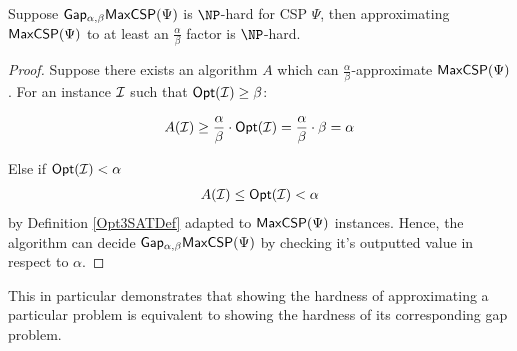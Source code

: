 \begin{theorem} \label{GapCSPtoAlgHard}
Suppose $\mathsf{Gap_{\alpha,\beta}}\mathsf{MaxCSP}(\Psi)$ is $\NP$-hard for CSP $\Psi$, then approximating $\mathsf{MaxCSP}(\Psi)$ to at least an $\frac{\alpha}{\beta}$ factor is $\NP$-hard.
\end{theorem}
%
\begin{proof}
Suppose there exists an algorithm $A$ which can $\frac{\alpha}{\beta}$-approximate $\mathsf{MaxCSP}(\Psi)$. For an instance $\mathcal{I}$ such that $\mathsf{Opt}(\mathcal{I}) \geq \beta$:

\begin{gather*}
A(\mathcal{I}) \geq  \frac{\alpha}{\beta} \cdot \mathsf{Opt}(\mathcal{I}) = \frac{\alpha}{\beta} \cdot \beta =  \alpha \\
\end{gather*}

Else if $\mathsf{Opt}(\mathcal{I}) < \alpha$
\begin{gather*}
A(\mathcal{I}) \leq \mathsf{Opt}(\mathcal{I}) < \alpha
\end{gather*}
by Definition \ref{Opt3SATDef} adapted to $\mathsf{MaxCSP}(\Psi)$ instances. Hence, the algorithm can decide  $\mathsf{Gap_{\alpha,\beta}}\mathsf{MaxCSP}(\Psi)$ by checking it's outputted value in respect to $\alpha$.
\end{proof}
%
This in particular demonstrates that showing the hardness of approximating a particular problem is equivalent to showing the hardness of its corresponding gap problem.



